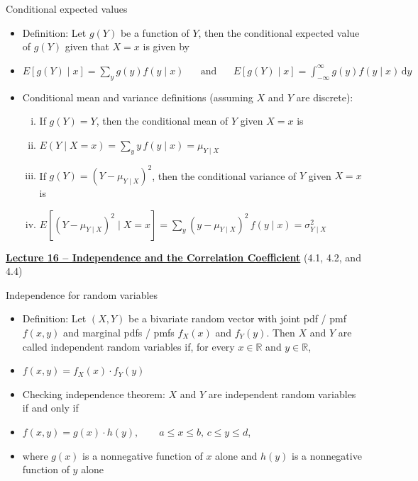 \documentclass{article}
\newcommand{\bu}[1]{\textbf{\ul{#1}}}				%
\newcommand{\integral}[4]{\displaystyle \int_{#1}^{#2} #3 \,\mathrm{d} #4}		%
\begin{document}
Conditional expected values
\begin{itemize}
    \item Definition: Let $g(Y)$ be a function of $Y$, then the conditional expected value of $g(Y)$ given that $X = x$ is given by 
    \item[] $\displaystyle E[g(Y) \mid x ] = \sum_y g(y) f(y \mid x) \hspace{20pt} \text{and} \hspace{20pt} E[g(Y) \mid x] = \integral{-\infty}{\infty}{g(y) f(y \mid x)}{y}$
    \item Conditional mean and variance definitions (assuming $X$ and $Y$ are discrete):
    \begin{enumerate}[i)]
        \item If $g(Y) = Y$, then the conditional mean of $Y$ given $X = x$ is
        \item[] $\displaystyle E(Y \mid X = x) = \sum_y y \, f(y \mid x) = \mu_{Y \mid X}$
        \item If $g(Y) = (Y - \mu_{Y\mid X})^2$, then the conditional variance of $Y$ given $X = x$ is
        \item[] $\displaystyle E[(Y - \mu_{Y \mid X})^2 \mid X = x] = \sum_y (y - \mu_{Y \mid X})^2 \, f(y \mid x) = \sigma_{Y \mid X}^2$
    \end{enumerate}
\end{itemize}\bigskip

\vspace{100pt}

{\large \bu{Lecture 16 -- Independence and the Correlation Coefficient}} (4.1, 4.2, and 4.4)\bigskip

Independence for random variables\bigskip
\begin{itemize}
    \item Definition: Let $(X,Y)$ be a bivariate random vector with joint pdf / pmf $f(x,y)$ and marginal pdfs / pmfs $f_X(x)$ and $f_Y(y)$. Then $X$ and $Y$ are called independent random variables if, for every $x \in \mathbb{R}$ and $y \in \mathbb{R}$,
    \item[] $f(x,y) = f_X(x) \cdot f_Y(y)$
    \item Checking independence theorem: $X$ and $Y$ are independent random variables if and only if 
    \item[] $f(x,y) = g(x) \cdot h(y), \quad\quad a \le x \le b, \, c \le y \le d$,
    \item[] where $g(x)$ is a nonnegative function of $x$ alone and $h(y)$ is a nonnegative function of $y$ alone
\end{itemize}\bigskip
\end{document}
